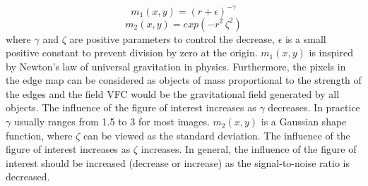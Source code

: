 \begin{equation}
{m} _{1} ( x,y ) =(r+\epsilon) ^{-\gamma}
\end{equation}
\begin{equation}
{m} _{2} ( x,y ) =exp(-r^{2}\, \zeta ^{2})
\end{equation}
where $\gamma$ and $\zeta$ are positive parameters to control the decrease, $\epsilon$ is a small positive constant to prevent division by zero at the origin. ${m} _{1} ( x,y )$ is inspired by Newton’s law  of universal gravitation in physics. Furthermore, the pixels in the edge map can be considered as objects of mass proportional to the strength of the edges and the field VFC would be the gravitational field generated by all objects. The influence of the figure of interest increases as $\gamma$ decreases. In practice $\gamma$ usually ranges from 1.5 to 3 for most images. ${m} _{2} ( x,y )$ is a Gaussian shape function, where $\zeta$ can be viewed as the standard deviation. The influence of the figure of interest increases as $\zeta$ increases. In general, the influence of the figure of interest should be increased (decrease or increase) as the signal-to-noise ratio is decreased.\cite{VFC}


